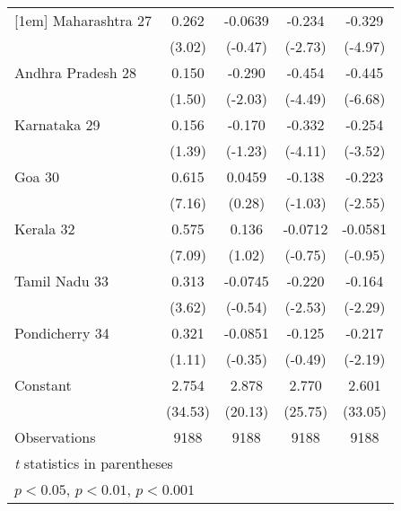 {\begin{tabular}{l*{4}{c}}
[1em]
Maharashtra 27      &       0.262\sym{**} &     -0.0639         &      -0.234\sym{**} &      -0.329\sym{***}\\
                    &      (3.02)         &     (-0.47)         &     (-2.73)         &     (-4.97)         \\
[1em]
Andhra Pradesh 28   &       0.150         &      -0.290\sym{*}  &      -0.454\sym{***}&      -0.445\sym{***}\\
                    &      (1.50)         &     (-2.03)         &     (-4.49)         &     (-6.68)         \\
[1em]
Karnataka 29        &       0.156         &      -0.170         &      -0.332\sym{***}&      -0.254\sym{***}\\
                    &      (1.39)         &     (-1.23)         &     (-4.11)         &     (-3.52)         \\
[1em]
Goa 30              &       0.615\sym{***}&      0.0459         &      -0.138         &      -0.223\sym{*}  \\
                    &      (7.16)         &      (0.28)         &     (-1.03)         &     (-2.55)         \\
[1em]
Kerala 32           &       0.575\sym{***}&       0.136         &     -0.0712         &     -0.0581         \\
                    &      (7.09)         &      (1.02)         &     (-0.75)         &     (-0.95)         \\
[1em]
Tamil Nadu 33       &       0.313\sym{***}&     -0.0745         &      -0.220\sym{*}  &      -0.164\sym{*}  \\
                    &      (3.62)         &     (-0.54)         &     (-2.53)         &     (-2.29)         \\
[1em]
Pondicherry 34      &       0.321         &     -0.0851         &      -0.125         &      -0.217\sym{*}  \\
                    &      (1.11)         &     (-0.35)         &     (-0.49)         &     (-2.19)         \\
[1em]
Constant            &       2.754\sym{***}&       2.878\sym{***}&       2.770\sym{***}&       2.601\sym{***}\\
                    &     (34.53)         &     (20.13)         &     (25.75)         &     (33.05)         \\
\hline
Observations        &        9188         &        9188         &        9188         &        9188         \\
\hline\hline
\multicolumn{5}{l}{\footnotesize \textit{t} statistics in parentheses}\\
\multicolumn{5}{l}{\footnotesize \sym{*} \(p<0.05\), \sym{**} \(p<0.01\), \sym{***} \(p<0.001\)}\\
\end{tabular}
}
